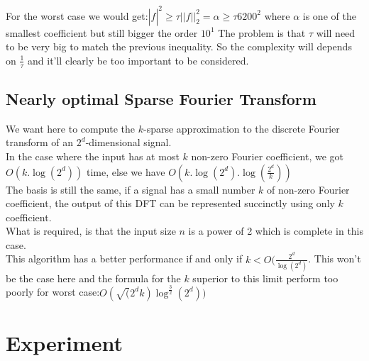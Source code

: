 \documentclass{article}
\begin{document}
For the worst case we would get:$|\hat{f}|^2 \geq \tau||f||^{2}_2 =  \alpha \geq \tau 6200^2$ where $\alpha$ is one of the smallest coefficient but still bigger the order $10^1$  
The problem is that $\tau$ will need to be very big to match the previous inequality. So the complexity will depends on $\frac{1}{\tau}$ and it'll clearly be too important to be considered.\\

\subsection{Nearly optimal Sparse Fourier Transform}

We want here to compute the $k$-sparse approximation to the discrete Fourier transform of an $2^d$-dimensional signal.\\
In the case where the input has at most $k$ non-zero Fourier coefficient, we got $O(k.\log(2^d))$ time, else we have $O(k.\log(2^d).\log(\frac{2^d}{k}))$\\
The basis is still the same, if a signal has a small number $k$ of non-zero Fourier coefficient, the output of this DFT can be represented succinctly using only $k$ coefficient.\\
What is required, is that the input size $n$ is a power of 2 which is complete in this case.\\
This algorithm has a better performance if and only if $ k < O(\frac{2^d}{\log(2^d)}$. This won't be the case here and the formula for the $k$ superior to this limit perform too poorly for worst case:$O(\sqrt(2^d k) \log^{\frac{3}{2}}(2^d))$


\section*{Experiment}
\end{document}
